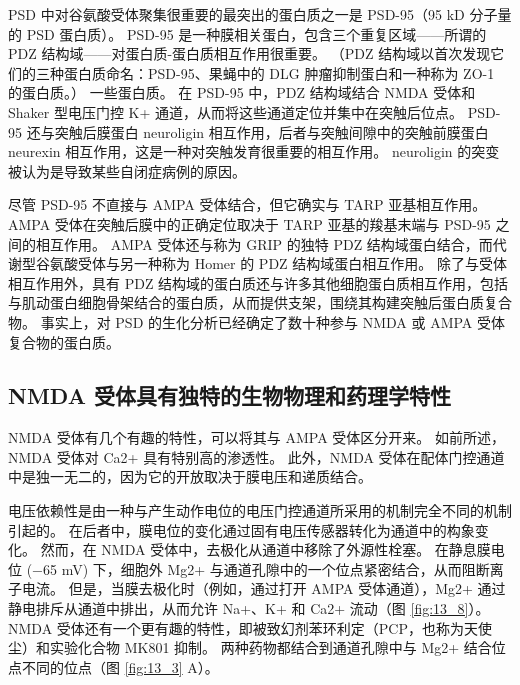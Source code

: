 PSD 中对谷氨酸受体聚集很重要的最突出的蛋白质之一是 PSD-95（95 kD 分子量的 PSD 蛋白质）。 
PSD-95 是一种膜相关蛋白，包含三个重复区域——所谓的 PDZ 结构域——对蛋白质-蛋白质相互作用很重要。 （PDZ 结构域以首次发现它们的三种蛋白质命名：PSD-95、果蝇中的 DLG 肿瘤抑制蛋白和一种称为 ZO-1 的蛋白质。） 一些蛋白质。 
在 PSD-95 中，PDZ 结构域结合 NMDA 受体和 Shaker 型电压门控 K+ 通道，从而将这些通道定位并集中在突触后位点。 
PSD-95 还与突触后膜蛋白 neuroligin 相互作用，后者与突触间隙中的突触前膜蛋白 neurexin 相互作用，这是一种对突触发育很重要的相互作用。 neuroligin 的突变被认为是导致某些自闭症病例的原因。


尽管 PSD-95 不直接与 AMPA 受体结合，但它确实与 TARP 亚基相互作用。 
AMPA 受体在突触后膜中的正确定位取决于 TARP 亚基的羧基末端与 PSD-95 之间的相互作用。 
AMPA 受体还与称为 GRIP 的独特 PDZ 结构域蛋白结合，而代谢型谷氨酸受体与另一种称为 Homer 的 PDZ 结构域蛋白相互作用。 
除了与受体相互作用外，具有 PDZ 结构域的蛋白质还与许多其他细胞蛋白质相互作用，包括与肌动蛋白细胞骨架结合的蛋白质，从而提供支架，围绕其构建突触后蛋白质复合物。 
事实上，对 PSD 的生化分析已经确定了数十种参与 NMDA 或 AMPA 受体复合物的蛋白质。


\subsection{NMDA 受体具有独特的生物物理和药理学特性}

NMDA 受体有几个有趣的特性，可以将其与 AMPA 受体区分开来。 
如前所述，NMDA 受体对 Ca2+ 具有特别高的渗透性。 
此外，NMDA 受体在配体门控通道中是独一无二的，因为它的开放取决于膜电压和递质结合。


电压依赖性是由一种与产生动作电位的电压门控通道所采用的机制完全不同的机制引起的。 
在后者中，膜电位的变化通过固有电压传感器转化为通道中的构象变化。
然而，在 NMDA 受体中，去极化从通道中移除了外源性栓塞。 
在静息膜电位 (−65 mV) 下，细胞外 Mg2+ 与通道孔隙中的一个位点紧密结合，从而阻断离子电流。 
但是，当膜去极化时（例如，通过打开 AMPA 受体通道），Mg2+ 通过静电排斥从通道中排出，从而允许 Na+、K+ 和 Ca2+ 流动（图 \ref{fig:13_8}）。 
NMDA 受体还有一个更有趣的特性，即被致幻剂苯环利定（PCP，也称为天使尘）和实验化合物 MK801 抑制。 
两种药物都结合到通道孔隙中与 Mg2+ 结合位点不同的位点（图 \ref{fig:13_3} A）。

